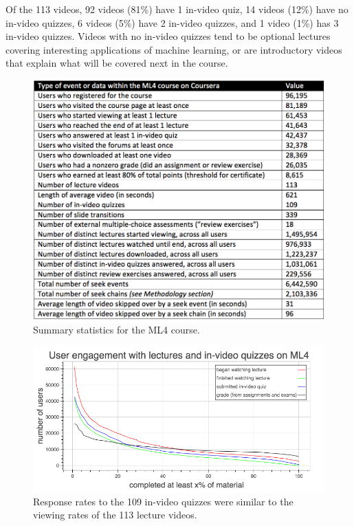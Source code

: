 \documentclass{sigchi}
\begin{document}
Of the 113 videos, 92 videos (81\%) have 1 in-video quiz, 14 videos (12\%) have no in-video quizzes, 6 videos (5\%) have 2 in-video quizzes, and 1 video (1\%) has 3 in-video quizzes. Videos with no in-video quizzes tend to be optional lectures covering interesting applications of machine learning, or are introductory videos that explain what will be covered next in the course. %

\begin{figure}
\includegraphics[width=1.0\columnwidth]{summary-statistics}
\caption{Summary statistics for the ML4 course.}
\label{fig:summary-statistics}
\end{figure}

\begin{figure}
\includegraphics[width=1.0\columnwidth]{user-engagement-with-material}
\caption{Response rates to the 109 in-video quizzes were similar to the viewing rates of the 113 lecture videos.}
\label{fig:user-engagement-with-material}
\end{figure}
\end{document}
